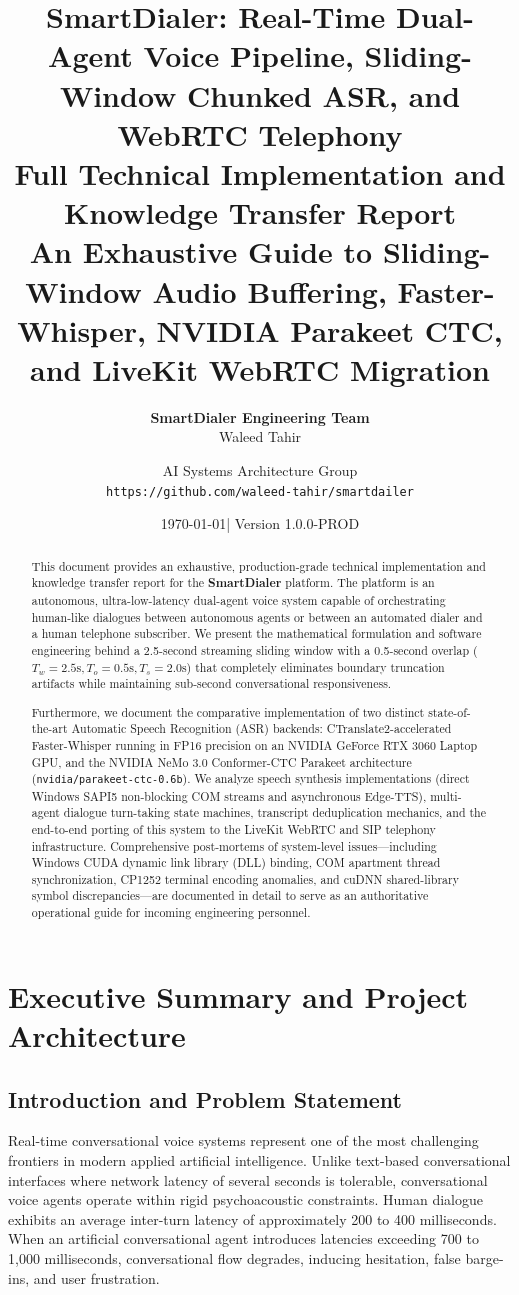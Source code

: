 \documentclass[11pt,a4paper,titlepage]{report}
\title{
    \vspace{-2cm}
    \Huge \textbf{SmartDialer: Real-Time Dual-Agent Voice Pipeline, Sliding-Window Chunked ASR, and WebRTC Telephony}\\
    \vspace{0.8cm}
    \LARGE \textbf{Full Technical Implementation and Knowledge Transfer Report}\\
    \vspace{0.5cm}
    \large An Exhaustive Guide to Sliding-Window Audio Buffering, Faster-Whisper, NVIDIA Parakeet CTC, and LiveKit WebRTC Migration
}
\author{
    \textbf{SmartDialer Engineering Team} \\
    Waleed Tahir \and AI Systems Architecture Group\\
    \texttt{https://github.com/waleed-tahir/smartdailer}
}
\date{\today \quad | \quad Version 1.0.0-PROD}
\begin{document}
\maketitle

\begin{abstract}
This document provides an exhaustive, production-grade technical implementation and knowledge transfer report for the \textbf{SmartDialer} platform. The platform is an autonomous, ultra-low-latency dual-agent voice system capable of orchestrating human-like dialogues between autonomous agents or between an automated dialer and a human telephone subscriber. We present the mathematical formulation and software engineering behind a 2.5-second streaming sliding window with a 0.5-second overlap ($T_w = 2.5\text{s}, T_o = 0.5\text{s}, T_s = 2.0\text{s}$) that completely eliminates boundary truncation artifacts while maintaining sub-second conversational responsiveness.

Furthermore, we document the comparative implementation of two distinct state-of-the-art Automatic Speech Recognition (ASR) backends: CTranslate2-accelerated Faster-Whisper running in FP16 precision on an NVIDIA GeForce RTX 3060 Laptop GPU, and the NVIDIA NeMo 3.0 Conformer-CTC Parakeet architecture (\texttt{nvidia/parakeet-ctc-0.6b}). We analyze speech synthesis implementations (direct Windows SAPI5 non-blocking COM streams and asynchronous Edge-TTS), multi-agent dialogue turn-taking state machines, transcript deduplication mechanics, and the end-to-end porting of this system to the LiveKit WebRTC and SIP telephony infrastructure. Comprehensive post-mortems of system-level issues---including Windows CUDA dynamic link library (DLL) binding, COM apartment thread synchronization, CP1252 terminal encoding anomalies, and cuDNN shared-library symbol discrepancies---are documented in detail to serve as an authoritative operational guide for incoming engineering personnel.
\end{abstract}

\tableofcontents
\newpage

\chapter{Executive Summary and Project Architecture}

\section{Introduction and Problem Statement}
Real-time conversational voice systems represent one of the most challenging frontiers in modern applied artificial intelligence. Unlike text-based conversational interfaces where network latency of several seconds is tolerable, conversational voice agents operate within rigid psychoacoustic constraints. Human dialogue exhibits an average inter-turn latency of approximately 200 to 400 milliseconds. When an artificial conversational agent introduces latencies exceeding 700 to 1,000 milliseconds, conversational flow degrades, inducing hesitation, false barge-ins, and user frustration.
\end{document}
